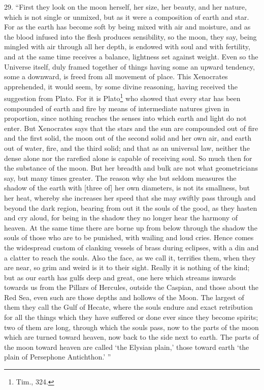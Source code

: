 \documentclass[a4paper, 11pt, oneside, polutonikogreek, english]{article}
\begin{document}
29. ``First they look on the moon herself, her size, her beauty, and her nature, which is not single or unmixed, but as it were a composition of earth and star. For as the earth has become soft by being mixed with air and moisture, and as the blood infused into the flesh produces sensibility, so the moon, they say, being mingled with air through all her depth, is endowed with soul and with fertility, and at the same time receives a balance, lightness set against weight. Even so the Universe itself, duly framed together of things having some an upward tendency, some a downward, is freed from all movement of place. This Xenocrates apprehended, it would seem, by some divine reasoning, having received the suggestion from Plato. For it is Plato\footnote{Tim., 324.} who showed that every star has been compounded of earth and fire by means of intermediate natures given in proportion, since nothing reaches the senses into which earth and light do not enter. But Xenocrates says that the stars and the sun are compounded out of fire and the first solid, the moon out of the second solid and her own air, and earth out of water, fire, and the third solid; and that as an universal law, neither the dense alone nor the rarefied alone is capable of receiving soul. So much then for the substance of the moon. But her breadth and bulk are not what geometricians say, but many times greater. The reason why she but seldom measures the shadow of the earth with [three of] her own diameters, is not its smallness, but her heat, whereby she increases her speed that she may swiftly pass through and beyond the dark region, bearing from out it the souls of the good, as they hasten and cry aloud, for being in the shadow they no longer hear the harmony of heaven. At the same time there are borne up from below through the shadow the souls of those who are to be punished, with wailing and loud cries. Hence comes the widespread custom of clanking vessels of brass during eclipses, with a din and a clatter to reach the souls. Also the face, as we call it, terrifies them, when they are near, so grim and weird is it to their sight. Really it is nothing of the kind; but as our earth has gulfs deep and great, one here which streams inwards towards us from the Pillars of Hercules, outside the Caspian, and those about the Red Sea, even such are those depths and hollows of the Moon. The largest of them they call the Gulf of Hecate, where the souls endure and exact retribution for all the things which they have suffered or done ever since they become spirits; two of them are long, through which the souls pass, now to the parts of the moon which are turned toward heaven, now back to the side next to earth. The parts of the moon toward heaven are called `the Elysian plain,' those toward earth `the plain of Persephone Antichthon.' ''
\end{document}
